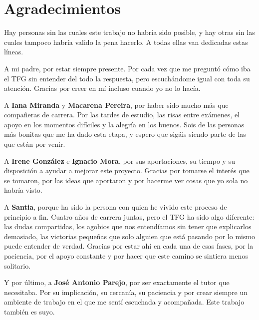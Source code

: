 \chapter*{Agradecimientos}

Hay personas sin las cuales este trabajo no habría sido posible, y hay otras sin las cuales tampoco habría valido la pena hacerlo. A todas ellas van dedicadas estas líneas.

A mi padre, por estar siempre presente. Por cada vez que me preguntó cómo iba el TFG sin entender del todo la respuesta, pero escuchándome igual con toda su atención. Gracias por creer en mí incluso cuando yo no lo hacía.

A \textbf{Iana Miranda} y \textbf{Macarena Pereira}, por haber sido mucho más que compañeras de carrera. Por las tardes de estudio, las risas entre exámenes, el apoyo en los momentos difíciles y la alegría en los buenos. Sois de las personas más bonitas que me ha dado esta etapa, y espero que sigáis siendo parte de las que están por venir.

A \textbf{Irene González} e \textbf{Ignacio Mora}, por sus aportaciones, su tiempo y su disposición a ayudar a mejorar este proyecto. Gracias por tomarse el interés que se tomaron, por las ideas que aportaron y por hacerme ver cosas que yo sola no habría visto.

A \textbf{Santia}, porque ha sido la persona con quien he vivido este proceso de principio a fin. Cuatro años de carrera juntas, pero el TFG ha sido algo diferente: las dudas compartidas, los agobios que nos entendíamos sin tener que explicarlos demasiado, las victorias pequeñas que solo alguien que está pasando por lo mismo puede entender de verdad. Gracias por estar ahí en cada una de esas fases, por la paciencia, por el apoyo constante y por hacer que este camino se sintiera menos solitario.

Y por último, a \textbf{José Antonio Parejo}, por ser exactamente el tutor que necesitaba. Por su implicación, su cercanía, su paciencia y por crear siempre un ambiente de trabajo en el que me sentí escuchada y acompañada. Este trabajo también es suyo.
